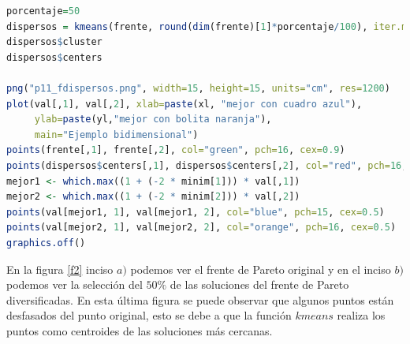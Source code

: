 \documentclass{article}
\begin{document}
\lstset{style=mystyle}
\begin{lstlisting}[language=R, caption= Código para diversificar las soluciones del frente de Pareto.]
porcentaje=50
dispersos = kmeans(frente, round(dim(frente)[1]*porcentaje/100), iter.max = 1000, nstart = 50, algorithm = "Lloyd")
dispersos$cluster
dispersos$centers

png("p11_fdispersos.png", width=15, height=15, units="cm", res=1200)
plot(val[,1], val[,2], xlab=paste(xl, "mejor con cuadro azul"),
     ylab=paste(yl,"mejor con bolita naranja"),
     main="Ejemplo bidimensional")
points(frente[,1], frente[,2], col="green", pch=16, cex=0.9)
points(dispersos$centers[,1], dispersos$centers[,2], col="red", pch=16, cex=0.6)
mejor1 <- which.max((1 + (-2 * minim[1])) * val[,1])
mejor2 <- which.max((1 + (-2 * minim[2])) * val[,2])
points(val[mejor1, 1], val[mejor1, 2], col="blue", pch=15, cex=0.5)
points(val[mejor2, 1], val[mejor2, 2], col="orange", pch=16, cex=0.5)
graphics.off()
\end{lstlisting}

En la figura \ref{f2} inciso $a)$ podemos ver el frente de Pareto original y en el inciso $b)$ podemos ver la selección del $50\%$ de las soluciones del frente de Pareto diversificadas. En esta última figura se puede observar que algunos puntos están desfasados del punto original, esto se debe a que la función $kmeans$ realiza los puntos como centroides de las soluciones más cercanas.
\end{document}
